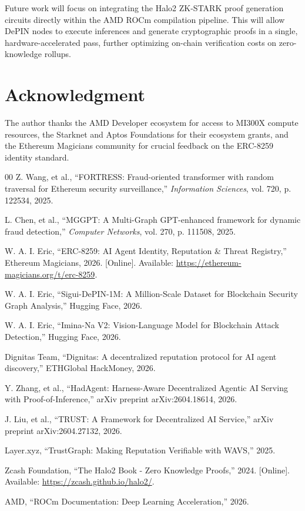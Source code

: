 \documentclass[conference,10pt]{IEEEtran}
\begin{document}
Future work will focus on integrating the Halo2 ZK-STARK proof generation circuits directly within the AMD ROCm compilation pipeline. This will allow DePIN nodes to execute inferences and generate cryptographic proofs in a single, hardware-accelerated pass, further optimizing on-chain verification costs on zero-knowledge rollups.

\section*{Acknowledgment}
The author thanks the AMD Developer ecosystem for access to MI300X compute resources, the Starknet and Aptos Foundations for their ecosystem grants, and the Ethereum Magicians community for crucial feedback on the ERC-8259 identity standard.

\begin{thebibliography}{00}
Z. Wang, et al., ``FORTRESS: Fraud-oriented transformer with random traversal for Ethereum security surveillance,'' \textit{Information Sciences}, vol. 720, p. 122534, 2025.

L. Chen, et al., ``MGGPT: A Multi-Graph GPT-enhanced framework for dynamic fraud detection,'' \textit{Computer Networks}, vol. 270, p. 111508, 2025.

W. A. I. Eric, ``ERC-8259: AI Agent Identity, Reputation \& Threat Registry,'' Ethereum Magicians, 2026. [Online]. Available: \url{https://ethereum-magicians.org/t/erc-8259}.

W. A. I. Eric, ``Sigui-DePIN-1M: A Million-Scale Dataset for Blockchain Security Graph Analysis,'' Hugging Face, 2026.

W. A. I. Eric, ``Imina-Na V2: Vision-Language Model for Blockchain Attack Detection,'' Hugging Face, 2026.

Dignitas Team, ``Dignitas: A decentralized reputation protocol for AI agent discovery,'' ETHGlobal HackMoney, 2026.

Y. Zhang, et al., ``HadAgent: Harness-Aware Decentralized Agentic AI Serving with Proof-of-Inference,'' arXiv preprint arXiv:2604.18614, 2026.

J. Liu, et al., ``TRUST: A Framework for Decentralized AI Service,'' arXiv preprint arXiv:2604.27132, 2026.

Layer.xyz, ``TrustGraph: Making Reputation Verifiable with WAVS,'' 2025.

Zcash Foundation, ``The Halo2 Book - Zero Knowledge Proofs,'' 2024. [Online]. Available: \url{https://zcash.github.io/halo2/}.

AMD, ``ROCm Documentation: Deep Learning Acceleration,'' 2026.
\end{thebibliography}
\end{document}
